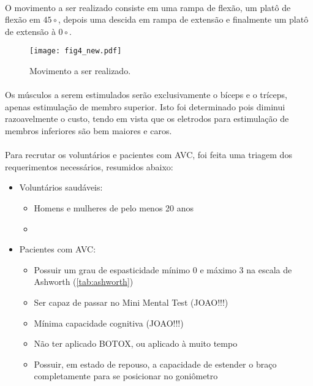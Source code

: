 \paragraph{}O movimento a ser realizado consiste em uma rampa de flexão, um platô de flexão em $45\circ$, depois uma descida em rampa de extensão e finalmente um platô de extensão à $0\circ$.

\begin{figure}[H]
	\centering
	\texttt{[image: fig4\_new.pdf]}
	\caption{Movimento a ser realizado.}
	\label{fig:protocol_mov}
\end{figure}

\paragraph{}Os músculos a serem estimulados serão exclusivamente o bíceps e o tríceps, apenas estimulação de membro superior. Isto foi determinado pois diminui razoavelmente o custo, tendo em vista que os eletrodos para estimulação de membros inferiores são bem maiores e caros.

\paragraph{}Para recrutar os voluntários e pacientes com AVC, foi feita uma triagem dos requerimentos necessários, resumidos abaixo:

\begin{itemize}
	\item Voluntários saudáveis:
	\begin{itemize}
		\item Homens e mulheres de pelo menos 20 anos
		\item 
	\end{itemize}
	\item Pacientes com AVC:
	\begin{itemize}
		\item Possuir um grau de espasticidade mínimo 0 e máximo 3 na escala de Ashworth (\ref{tab:ashworth})
		\item Ser capaz de passar no Mini Mental Test (JOAO!!!)
		\item Mínima capacidade cognitiva (JOAO!!!)
		\item Não ter aplicado BOTOX, ou aplicado à muito tempo
		\item Possuir, em estado de repouso, a capacidade de estender o braço completamente para se posicionar no goniômetro
	\end{itemize}
\end{itemize}

